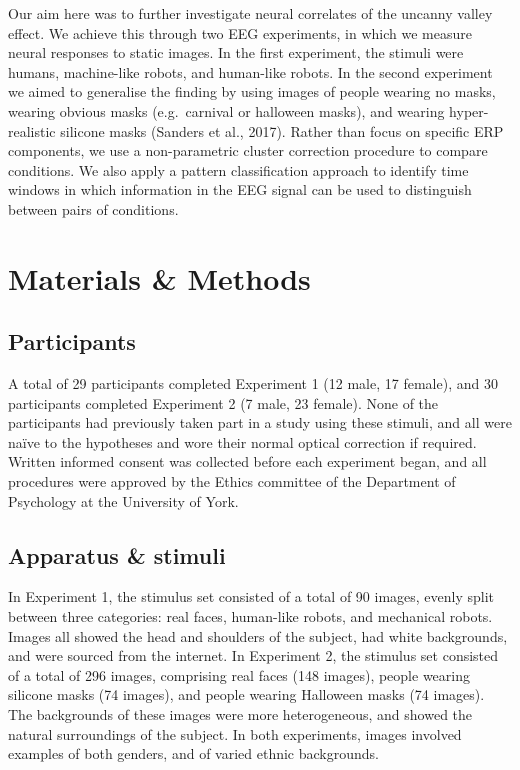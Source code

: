 \documentclass[
]{article}
\begin{document}
Our aim here was to further investigate neural correlates of the uncanny valley effect. We achieve this through two EEG experiments, in which we measure neural responses to static images. In the first experiment, the stimuli were humans, machine-like robots, and human-like robots. In the second experiment we aimed to generalise the finding by using images of people wearing no masks, wearing obvious masks (e.g.~carnival or halloween masks), and wearing hyper-realistic silicone masks (Sanders et al., 2017). Rather than focus on specific ERP components, we use a non-parametric cluster correction procedure to compare conditions. We also apply a pattern classification approach to identify time windows in which information in the EEG signal can be used to distinguish between pairs of conditions.

\hypertarget{materials-methods}{%
\section{Materials \& Methods}\label{materials-methods}}

\hypertarget{participants}{%
\subsection{Participants}\label{participants}}

A total of 29 participants completed Experiment 1 (12 male, 17 female), and 30 participants completed Experiment 2 (7 male, 23 female). None of the participants had previously taken part in a study using these stimuli, and all were naïve to the hypotheses and wore their normal optical correction if required. Written informed consent was collected before each experiment began, and all procedures were approved by the Ethics committee of the Department of Psychology at the University of York.

\hypertarget{apparatus-stimuli}{%
\subsection{Apparatus \& stimuli}\label{apparatus-stimuli}}

In Experiment 1, the stimulus set consisted of a total of 90 images, evenly split between three categories: real faces, human-like robots, and mechanical robots. Images all showed the head and shoulders of the subject, had white backgrounds, and were sourced from the internet. In Experiment 2, the stimulus set consisted of a total of 296 images, comprising real faces (148 images), people wearing silicone masks (74 images), and people wearing Halloween masks (74 images). The backgrounds of these images were more heterogeneous, and showed the natural surroundings of the subject. In both experiments, images involved examples of both genders, and of varied ethnic backgrounds.
\end{document}
